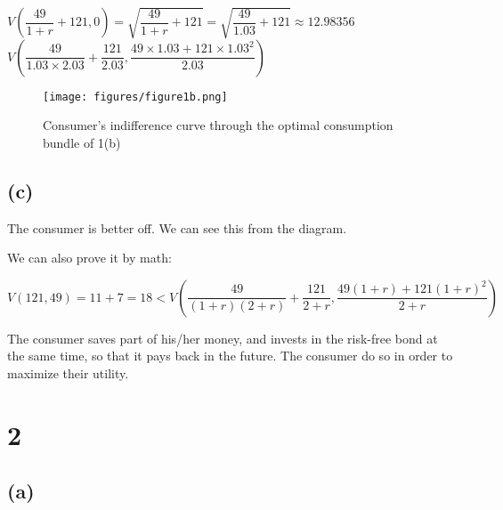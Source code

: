 \documentclass{article}
\begin{document}
$V\left(\dfrac{49}{1+r}+121,0\right)=\sqrt{\dfrac{49}{1+r}+121}=\sqrt{\dfrac{49}{1.03}+121}\approx12.98356$\\

$V\left(\dfrac{49}{1.03\times2.03}+\dfrac{121}{2.03}, \dfrac{49\times1.03+121\times1.03^{2}}{2.03}\right)$

\begin{figure}[H]
    \begin{center}
        \texttt{[image: figures/figure1b.png]}
    \end{center}
    \caption{Consumer's indifference curve through the optimal consumption bundle of 1(b)}
    \label{fig:graph}
\end{figure}

\subsection*{(c)}

The consumer is better off. We can see this from the diagram.

We can also prove it by math:

$V\left(121,49\right)=11+7=18<V\left(\dfrac{49}{\left(1+r\right)\left(2+r\right)}+\dfrac{121}{2+r}, \dfrac{49\left(1+r\right)+121\left(1+r\right)^{2}}{2+r}\right)$

The consumer saves part of his/her money, and invests in the risk-free bond at the same time, so that it pays back in the future. The consumer do so in order to maximize their utility.

\section*{2}

\subsection*{(a)}

\end{document}
